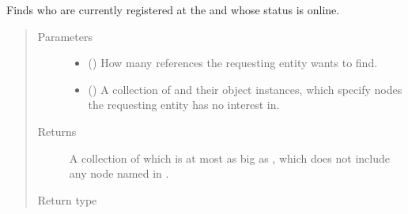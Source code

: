 \documentclass[letterpaper,10pt,english]{sphinxmanual}
\begin{document}
\begin{fulllineitems}
\begin{fulllineitems}
\label{\detokenize{app.domain:app.domain.master_servers.Master.find_online_nodes}}
Finds  {\hyperref[\detokenize{app.domain:app.domain.network_nodes.Node}]{}} who are currently registered at the
 and whose status is online.
\begin{quote}\begin{description}
\item[{Parameters}] \leavevmode\begin{itemize}
\item {} 
 () \textendash{} How many {\hyperref[\detokenize{app.domain:app.domain.network_nodes.Node}]{}} references the requesting
entity wants to find.

\item {} 
 ({\hyperref[\detokenize{app:app.type_hints.NodeDict}]{}}) \textendash{} A collection of {\hyperref[\detokenize{app.domain:app.domain.network_nodes.Node.id}]{}} and their object
instances, which specify nodes the requesting entity has
no interest in.

\end{itemize}

\item[{Returns}] \leavevmode
A collection of {\hyperref[\detokenize{app.domain:app.domain.network_nodes.Node}]{}}
which is at most as big as , which does not include any
node named in .

\item[{Return type}] \leavevmode
{\hyperref[\detokenize{app:app.type_hints.NodeDict}]{}}

\end{description}\end{quote}


\end{fulllineitems}
\end{fulllineitems}
\end{document}
